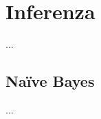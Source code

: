 \section{Inferenza}\label{sec:inference-ctbnc}
...

\subsection{Na\"ive Bayes}\label{sec:inference-ctnb}
...

